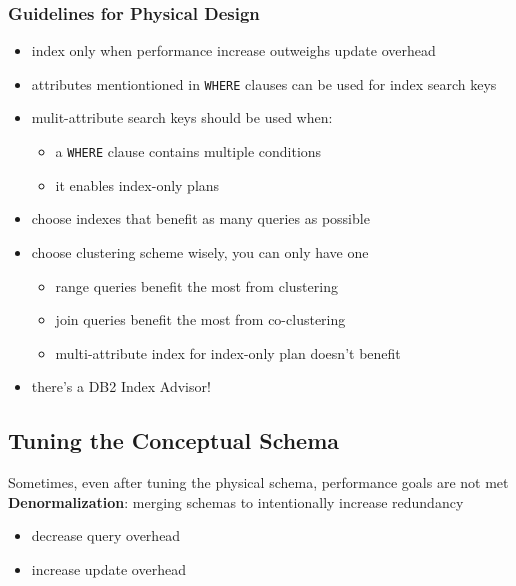 \documentclass[]{article}
\theoremstyle{definition}
\begin{document}
	\subsubsection{Guidelines for Physical Design}
	\begin{itemize}
		\item index only when performance increase outweighs update overhead
		\item attributes mentiontioned in \lstinline|WHERE| clauses can be used for index search keys
		\item mulit-attribute search keys should be used when:
			\begin{itemize}
				\item a \lstinline|WHERE| clause contains multiple conditions 
				\item it enables index-only plans
			\end{itemize}
		\item choose indexes that benefit as many queries as possible
		\item choose clustering scheme wisely, you can only have one
			\begin{itemize}
				\item range queries benefit the most from clustering
				\item join queries benefit the most from co-clustering
				\item multi-attribute index for index-only plan doesn't benefit
			\end{itemize}
		\item there's a DB2 Index Advisor!
	\end{itemize}

	\subsection{Tuning the Conceptual Schema}
	Sometimes, even after tuning the physical schema, performance goals are not met \\

	\textbf{Denormalization}: merging schemas to intentionally increase redundancy
	\begin{itemize}
		\item decrease query overhead
		\item increase update overhead
	\end{itemize}
\end{document}
